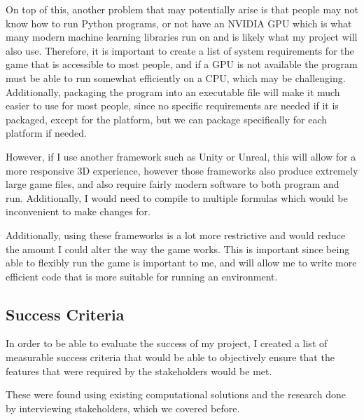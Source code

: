 \vs
On top of this, another problem that may potentially arise is that people may not know how to run Python programs, or not have an NVIDIA GPU which is what many modern machine learning libraries run on and is likely what my project will also use. Therefore, it is important to create a list of system requirements for the game that is accessible to most people, and if a GPU is not available the program must be able to run somewhat efficiently on a CPU, which may be challenging. Additionally, packaging the program into an executable file will make it much easier to use for most people, since no specific requirements are needed if it is packaged, except for the platform, but we can package specifically for each platform if needed.

\vs
However, if I use another framework such as Unity or Unreal, this will allow for a more responsive 3D experience, however those frameworks also produce extremely large game files, and also require fairly modern software to both program and run. Additionally, I would need to compile to multiple formulas which would be inconvenient to make changes for.

\vs
Additionally, using these frameworks is a lot more restrictive and would reduce the amount I could alter the way the game works. This is important since being able to flexibly run the game is important to me, and will allow me to write more efficient code that is more suitable for running an environment.


\subsection{Success Criteria}

In order to be able to evaluate the success of my project, I created a list of measurable success criteria that would be able to objectively ensure that the features that were required by the stakeholders would be met.

\vs
These were found using existing computational solutions and the research done by interviewing stakeholders, which we covered before.
\vs

